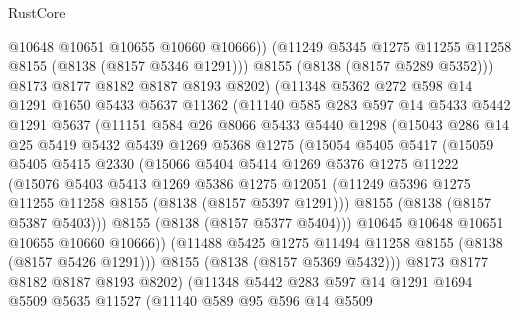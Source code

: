 \begin{lexlean}{RustCore}
\begin{coremodule}
                @10648
                @10651
                @10655
                @10660
                @10666))
            (@11249 @5345 @1275 @11255 @11258 @8155 (@8138 (@8157 @5346 @1291)))
            @8155
            (@8138 (@8157 @5289 @5352)))
          @8173
          @8177
          @8182
          @8187
          @8193
          @8202)
        (@11348
          @5362
          @272
          @598
          @14
          @1291
          @1650
          @5433
          @5637
          @11362
          (@11140
            @585
            @283
            @597
            @14
            @5433
            @5442
            @1291
            @5637
            (@11151
              @584
              @26
              @8066
              @5433
              @5440
              @1298
              (@15043
                @286
                @14
                @25
                @5419
                @5432
                @5439
                @1269
                @5368
                @1275
                (@15054
                  @5405
                  @5417
                  (@15059
                    @5405
                    @5415
                    @2330
                    (@15066
                      @5404
                      @5414
                      @1269
                      @5376
                      @1275
                      @11222
                      (@15076
                        @5403
                        @5413
                        @1269
                        @5386
                        @1275
                        @12051
                        (@11249 @5396 @1275 @11255 @11258 @8155 (@8138 (@8157 @5397 @1291)))
                        @8155
                        (@8138 (@8157 @5387 @5403)))
                      @8155
                      (@8138 (@8157 @5377 @5404)))
                    @10645
                    @10648
                    @10651
                    @10655
                    @10660
                    @10666))
                (@11488 @5425 @1275 @11494 @11258 @8155 (@8138 (@8157 @5426 @1291)))
                @8155
                (@8138 (@8157 @5369 @5432)))
              @8173
              @8177
              @8182
              @8187
              @8193
              @8202)
            (@11348
              @5442
              @283
              @597
              @14
              @1291
              @1694
              @5509
              @5635
              @11527
              (@11140
                @589
                @95
                @596
                @14
                @5509

\end{coremodule}
\end{lexlean}
